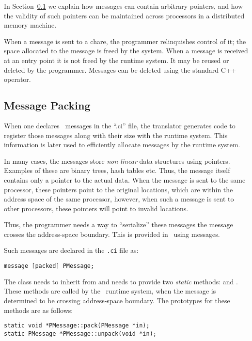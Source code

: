 In Section~\ref{message packing} we explain how messages can
contain arbitrary pointers, and how the validity of such pointers can be
maintained across processors in a distributed memory machine.

When a message  is sent to a chare, the programmer
relinquishes control of it; the space allocated to the message is
freed by the system.  When a message is received at an entry point it
is not freed by the runtime system.  It may be reused or deleted by
the programmer.  Messages can be deleted using the standard C++
 operator.  


\subsection{Message Packing}
\label{message packing}

When one declares \charmpp\ messages in the ``.ci'' file, the
translator generates code to register those messages along with their
size with the runtime system. This information is later used to
efficiently allocate messages by the runtime system.

In many cases, the messages store {\em non-linear} data structures
using pointers.  Examples of these are binary trees, hash tables
etc. Thus, the message itself contains only a pointer to the actual
data. When the message is sent to the same processor, these pointers
point to the original locations, which are within the address space of
the same processor, however, when such a message is sent to other
processors, these pointers will point to invalid locations.

Thus, the programmer needs a way to ``serialize'' these messages
 the message crosses the address-space boundary. This is
provided in \charmpp\ using
 messages.

Such messages are declared in the {\tt .ci} file as:

\verb+message [packed] PMessage;+

The class  needs to inherit from 
and needs to provide two {\em static} methods: 
and . These methods are called by the
\charmpp\ runtime system, when the message is determined to be
crossing address-space boundary. The prototypes for these methods are
as follows:

\begin{verbatim}
static void *PMessage::pack(PMessage *in);
static PMessage *PMessage::unpack(void *in);
\end{verbatim}

